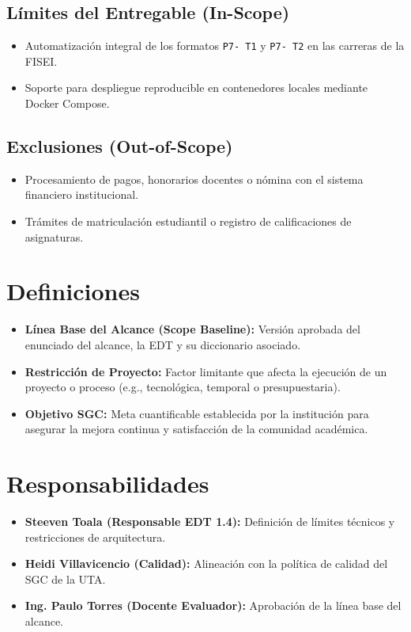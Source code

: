 \documentclass[12pt,a4paper]{article}
\begin{document}
\subsection{Límites del Entregable (In-Scope)}
\begin{itemize}[leftmargin=1.5em, itemsep=2pt]
    \item Automatización integral de los formatos \texttt{P7- T1} y \texttt{P7- T2} en las carreras de la FISEI.
    \item Soporte para despliegue reproducible en contenedores locales mediante Docker Compose.
\end{itemize}
\subsection{Exclusiones (Out-of-Scope)}
\begin{itemize}[leftmargin=1.5em, itemsep=2pt]
    \item Procesamiento de pagos, honorarios docentes o nómina con el sistema financiero institucional.
    \item Trámites de matriculación estudiantil o registro de calificaciones de asignaturas.
\end{itemize}

\section{Definiciones}
\begin{itemize}[leftmargin=1.5em, itemsep=2pt]
    \item \textbf{Línea Base del Alcance (Scope Baseline):} Versión aprobada del enunciado del alcance, la EDT y su diccionario asociado.
    \item \textbf{Restricción de Proyecto:} Factor limitante que afecta la ejecución de un proyecto o proceso (e.g., tecnológica, temporal o presupuestaria).
    \item \textbf{Objetivo SGC:} Meta cuantificable establecida por la institución para asegurar la mejora continua y satisfacción de la comunidad académica.
\end{itemize}

\section{Responsabilidades}
\begin{itemize}[leftmargin=1.5em, itemsep=2pt]
    \item \textbf{Steeven Toala (Responsable EDT 1.4):} Definición de límites técnicos y restricciones de arquitectura.
    \item \textbf{Heidi Villavicencio (Calidad):} Alineación con la política de calidad del SGC de la UTA.
    \item \textbf{Ing. Paulo Torres (Docente Evaluador):} Aprobación de la línea base del alcance.
\end{itemize}
\end{document}
